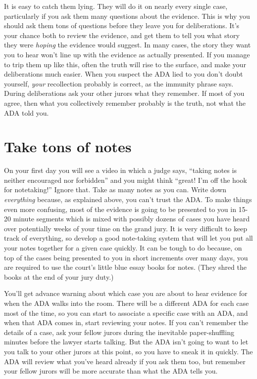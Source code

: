 \documentclass[letterpaper]{article}
\begin{document}
It is easy to catch them lying. They will do it on nearly every single case, particularly if you ask them many questions about the evidence.
This is why you should ask them tons of questions before they leave you for deliberations.
It's your chance both to review the evidence, and get them to tell you what story they were \emph{hoping} the evidence would suggest.
In many cases, the story they want you to hear won't line up with the evidence as actually presented. 
If you manage to trip them up like this, often the truth will rise to the surface, and make your deliberations much easier.
When you suspect the ADA lied to you don't doubt yourself, \emph{your} recollection probably is correct, as the immunity phrase says.
During deliberations ask your other jurors what they remember. If most of you agree, then what you collectively remember probably is the truth, not what the ADA told you. 

\section*{Take tons of notes}
On your first day you will see a video in which a judge says, ``taking notes is neither encouraged nor forbidden'' and you might think ``great! I'm off the hook for notetaking!''
Ignore that. Take as many notes as you can. 
Write down \emph{everything} because, as explained above, you can't trust the ADA. 
To make things even more confusing, most of the evidence is going to be presented to you in 15-20 minute segments which is mixed with possibly dozens of cases you have heard over potentially weeks of your time on the grand jury. 
It is very difficult to keep track of everything, so develop a good note-taking system that will let you put all your notes together for a given case quickly.
It can be tough to do because, on top of the cases being presented to you in short increments over many days, you are required to use the court's little blue essay books for notes.
(They shred the books at the end of your jury duty.)

You'll get advance warning about which case you are about to hear evidence for when the ADA walks into the room.
There will be a different ADA for each case most of the time, so you can start to associate a specific case with an ADA, and when that ADA comes in, start reviewing your notes.
If you can't remember the details of a case, ask your fellow jurors during the inevitable paper-shuffling minutes before the lawyer starts talking.
But the ADA isn't going to want to let you talk to your other jurors at this point, so you have to sneak it in quickly.
The ADA will review what you've heard already if you ask them too, but remember your fellow jurors will be more accurate than what the ADA tells you.
\end{document}

